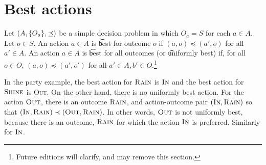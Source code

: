 \section*{Best actions}

Let $(A, \{O_a\}, \preceq)$ be a simple decision problem in which $O_a = S$ for each $a \in A$.
Let $o \in S$.
An action $a \in A$ is \t{best for outcome $o$} if $(a, o) \preceq (a', o)$ for all $a' \in A$.
An action $a \in A$ is \t{best for all outcomes} (or \t{uniformly best}) if, for all $o \in O$, $(a, o) \preceq (a', o')$ for all $a' \in A, b' \in O$.\footnote{Future editions will clarify, and may remove this section.}

In the party example, the best action for $\textsc{Rain}$ is $\textsc{In}$ and the best action for $\textsc{Shine}$ is \textsc{Out}.
On the other hand, there is no uniformly best action.
For the action $\textsc{Out}$, there is an outcome $\textsc{Rain}$, and action-outcome pair $(\textsc{In}, \textsc{Rain})$ so that $(\textsc{In}, \textsc{Rain}) \prec (\textsc{Out}, \textsc{Rain})$.
In other words, $\textsc{Out}$ is not uniformly best, because there is an outcome, $\textsc{Rain}$ for which the action $\textsc{In}$ is preferred.
Similarly for $\textsc{In}$.
